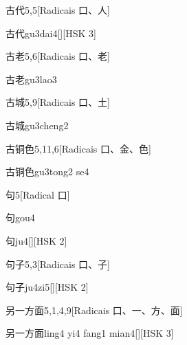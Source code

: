 \begin{entry}{古代}{5,5}[Radicais ⼝、⼈]
  \begin{phonetics}{古代}{gu3dai4}[][HSK 3]
  \end{phonetics}
\end{entry}

\begin{entry}{古老}{5,6}[Radicais ⼝、⽼]
  \begin{phonetics}{古老}{gu3lao3}
  \end{phonetics}
\end{entry}

\begin{entry}{古城}{5,9}[Radicais ⼝、⼟]
  \begin{phonetics}{古城}{gu3cheng2}
  \end{phonetics}
\end{entry}

\begin{entry}{古铜色}{5,11,6}[Radicais ⼝、⾦、⾊]
  \begin{phonetics}{古铜色}{gu3tong2 se4}
  \end{phonetics}
\end{entry}

\begin{entry}{句}{5}[Radical ⼝]
  \begin{phonetics}{句}{gou4}
  \end{phonetics}
  \begin{phonetics}{句}{ju4}[][HSK 2]
  \end{phonetics}
\end{entry}

\begin{entry}{句子}{5,3}[Radicais ⼝、⼦]
  \begin{phonetics}{句子}{ju4zi5}[][HSK 2]
  \end{phonetics}
\end{entry}

\begin{entry}{另一方面}{5,1,4,9}[Radicais ⼝、⼀、⽅、⾯]
  \begin{phonetics}{另一方面}{ling4 yi4 fang1 mian4}[][HSK 3]
  \end{phonetics}
\end{entry}

